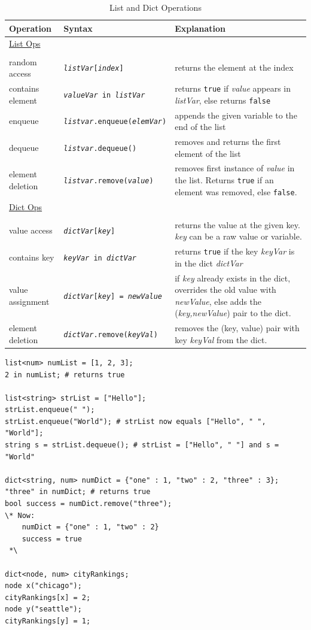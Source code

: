 \documentclass{article}
\newcommand{\code}[1]{\texttt{#1}} %
\begin{document}
\begin{table}[H]
\centering
\begin{tabular}{| p{1.5in} | p{2in} | p{2.25in} | }
\hline
Operation & Syntax & Explanation \\
\hline
\underline{List Ops} & & \\
& & \\
random access & \code{\emph{listVar}[\emph{index}]} & returns the element at the index \\
contains element & \code{\emph{valueVar} in \emph{listVar}} & returns \code{true} if \emph{value} appears in \emph{listVar}, else returns \code{false}  \\
enqueue & \code{\emph{listvar}.enqueue(\emph{elemVar})} & appends the given variable to the end of the list \\
dequeue & \code{\emph{listvar}.dequeue()} & removes and returns the first element of the list \\
element deletion & \code{\emph{listvar}.remove(\emph{value})} & removes first instance of \emph{value} in the list. Returns \code{true} if an element was removed, else \code{false}. \\
\hline
\underline{Dict Ops} & & \\
& & \\
value access & \code{\emph{dictVar}[\emph{key}]} & returns the value at the given key. \emph{key} can be a raw value or variable. \\
contains key & \code{\emph{keyVar} in \emph{dictVar}} & returns \code{true} if the key \emph{keyVar} is in the dict \emph{dictVar} \\
value assignment & \code{\emph{dictVar}[\emph{key}] = \emph{newValue}} & if \emph{key} already exists in the dict, overrides the old value with \emph{newValue}, else adds the (\emph{key,newValue}) pair to the dict. \\
element deletion & \code{\emph{dictVar}.remove(\emph{keyVal})} & removes the (key, value) pair with key \emph{keyVal} from the dict.\\
\hline
\end{tabular}
\caption{List and Dict Operations}
\label{tbl:dict-list-ops}
\end{table}

\begin{lstlisting}[language=pltLang, caption=Declaration of ``list'' and ``dict'' types., label=lst:list-dict-dec]
list<num> numList = [1, 2, 3];
2 in numList; # returns true

list<string> strList = ["Hello"];
strList.enqueue(" ");
strList.enqueue("World"); # strList now equals ["Hello", " ", "World"];
string s = strList.dequeue(); # strList = ["Hello", " "] and s = "World"

dict<string, num> numDict = {"one" : 1, "two" : 2, "three" : 3};
"three" in numDict; # returns true
bool success = numDict.remove("three"); 
\* Now:
    numDict = {"one" : 1, "two" : 2}
    success = true
 *\

dict<node, num> cityRankings;
node x("chicago");
cityRankings[x] = 2;
node y("seattle");
cityRankings[y] = 1;

\end{lstlisting}
\end{document}
